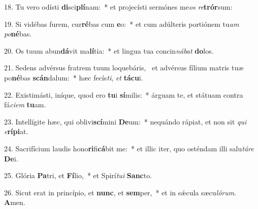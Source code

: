 18. Tu vero odísti \textbf{di}sci\textbf{plí}nam:~*  et projecísti sermónes me\textit{os} \textit{re}\textbf{trór}sum:\

19. Si vidébas furem, cur\textbf{ré}bas cum \textbf{e}o:~*  et cum adúlteris portiónem tu\textit{am} \textit{po}\textbf{né}bas.\

20. Os tuum abun\textbf{dá}vit ma\textbf{lí}tia:~*  et lingua tua concin\textit{ná}\textit{bat} \textbf{do}los.\

21. Sedens advérsus fratrem tuum loquebáris, \dag\  et advérsus fílium matris tuæ po\textbf{né}bas \textbf{scán}dalum:~*  hæc fecís\textit{ti}, \textit{et} \textbf{tá}\textbf{cu}i.\

22. Existimásti, iníque, quod ero \textbf{tu}i \textbf{sí}milis:~*  árguam te, et státuam contra fá\textit{ci}\textit{em} \textbf{tu}am.\

23. Intellígite hæc, qui oblivi\textbf{scí}mini \textbf{De}um:~*  nequándo rápiat, et non sit \textit{qui} \textit{e}\textbf{rí}\textbf{pi}at.\

24. Sacrifícium laudis hono\textbf{ri}fi\textbf{cá}bit me:~*  et illic iter, quo osténdam illi salu\textit{tá}\textit{re} \textbf{De}i.\

25. Glória \textbf{Pa}tri, et \textbf{Fí}lio,~*  et Spirí\textit{tu}\textit{i} \textbf{Sanc}to.\

26. Sicut erat in princípio, et \textbf{nunc}, et \textbf{sem}per,~*  et in sǽcula sæcu\textit{ló}\textit{rum}. \textbf{A}men.\

